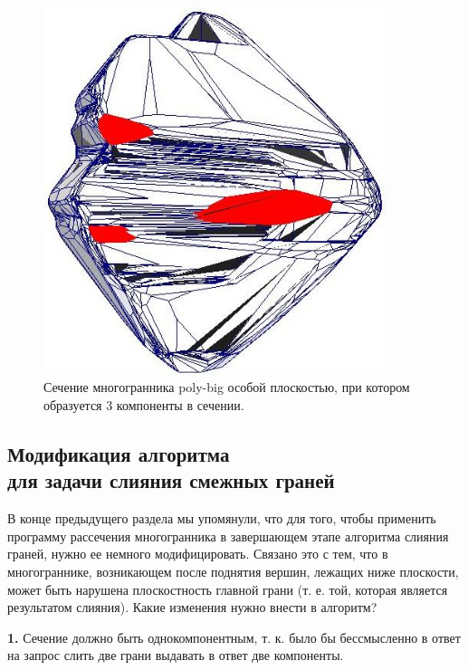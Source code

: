 \documentclass[a4paper,12pt, titlepage]{article}
\begin{document}
	\begin{flushleft}
		\begin{figure}[p]
		    \includegraphics[width=10cm]{poly-big/intersect4.jpeg}
		    \caption{Сечение многогранника poly-big особой плоскостью, при котором образуется 3 компоненты в 
		    сечении.}
		    \label{poly-big-6}
		\end{figure}
	\end{flushleft}

\newpage
\subsection{Модификация алгоритма \\для задачи слияния смежных граней}

\begin{flushleft}
 В конце предыдущего раздела мы упомянули, что для того, чтобы применить программу рассечения многогранника в 
завершающем этапе алгоритма слияния граней, нужно ее немного модифицировать. Связано это с тем, что 
в многограннике, возникающем после поднятия вершин, лежащих ниже плоскости, может быть нарушена плоскостность
главной грани (т. е. той, которая является результатом слияния). Какие изменения нужно внести в алгоритм?
\end{flushleft}

\begin{flushleft}
 \textbf{1.} Сечение должно быть однокомпонентным, т. к. было бы бессмысленно в ответ на запрос слить две грани
выдавать в ответ две компоненты.
\end{flushleft}
\end{document}
